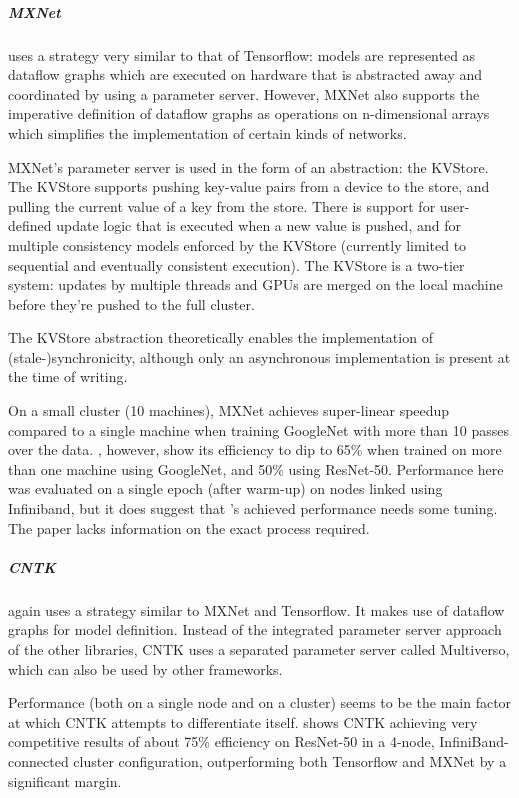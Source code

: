\subparagraph{MXNet \citep{MXNet2015}}
uses a strategy very similar to that of Tensorflow: models are represented as dataflow graphs which are executed on hardware that is abstracted away and coordinated by using a parameter server. However, MXNet also supports the imperative definition of dataflow graphs as operations on n-dimensional arrays which simplifies the implementation of certain kinds of networks.

MXNet's parameter server is used in the form of an abstraction: the KVStore. The KVStore supports pushing key-value pairs from a device to the store, and pulling the current value of a key from the store. There is support for user-defined update logic that is executed when a new value is pushed, and for multiple consistency models enforced by the KVStore (currently limited to sequential and eventually consistent execution). The KVStore is a two-tier system: updates by multiple threads and GPUs are merged on the local machine before they're pushed to the full cluster.

The KVStore abstraction theoretically enables the implementation of (stale-)synchronicity, although only an asynchronous implementation is present at the time of writing. 

On a small cluster (10 machines), MXNet achieves super-linear speedup compared to a single machine when training GoogleNet\citep{Szegedy2014} with more than 10 passes over the data. \citet{Shaohuai2017}, however, show its efficiency to dip to 65\% when trained on more than one machine using GoogleNet\citep{Szegedy2014}, and 50\% using ResNet-50\citet{He2015}. Performance here was evaluated on a single epoch (after warm-up) on nodes linked using Infiniband, but it does suggest that \citet{MXNet2015}'s achieved performance needs some tuning. The paper lacks information on the exact process required.

\subparagraph{CNTK}
again uses a strategy similar to MXNet and Tensorflow. It makes use of dataflow graphs for model definition. Instead of the integrated parameter server approach of the other libraries, CNTK uses a separated parameter server called Multiverso, which can also be used by other frameworks.

Performance (both on a single node and on a cluster) seems to be the main factor at which CNTK attempts to differentiate itself. \citet{Shaohuai2017} shows CNTK achieving very competitive results of about 75\% efficiency on ResNet-50\citep{He2015} in a 4-node, InfiniBand-connected cluster configuration, outperforming both Tensorflow and MXNet by a significant margin. 

